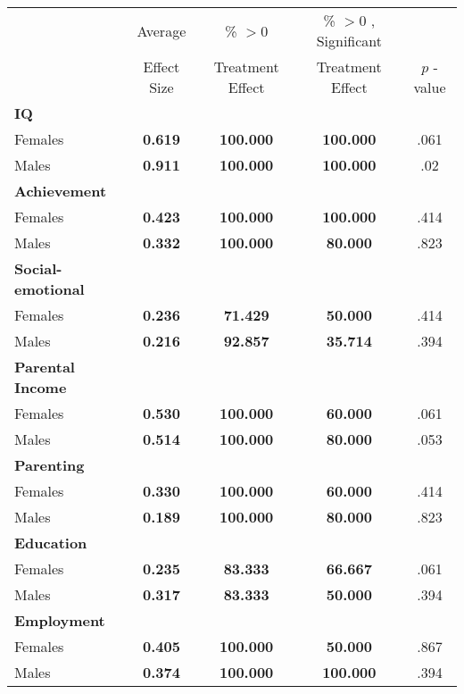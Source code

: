 \begin{tabular}{l c c c c}
\toprule
 & Average & \% $ >0 $ & \% $ >0 $ , Significant & \citet{Rosenbaum_2005_Distribution_JRSS} \\
 & Effect Size & Treatment Effect & Treatment Effect & $ p $ -value \\
\midrule
\textbf{IQ} & & & & \\
\quad Females &  \textbf{    0.619} & \textbf{  100.000} & \textbf{  100.000} & .061 \\
\quad Males &  \textbf{    0.911} & \textbf{  100.000} & \textbf{  100.000} & .02 \\
\midrule
\textbf{Achievement} & & & & \\
\quad Females &  \textbf{    0.423} & \textbf{  100.000} & \textbf{  100.000} & .414 \\
\quad Males &  \textbf{    0.332} & \textbf{  100.000} & \textbf{   80.000} & .823 \\
\midrule
\textbf{Social-emotional} & & & & \\
\quad Females &  \textbf{    0.236} & \textbf{   71.429} & \textbf{   50.000} & .414 \\
\quad Males &  \textbf{    0.216} & \textbf{   92.857} & \textbf{   35.714} & .394 \\
\midrule
\textbf{Parental Income} & & & & \\
\quad Females &  \textbf{    0.530} & \textbf{  100.000} & \textbf{   60.000} & .061 \\
\quad Males &  \textbf{    0.514} & \textbf{  100.000} & \textbf{   80.000} & .053 \\
\midrule
\textbf{Parenting} & & & & \\
\quad Females &  \textbf{    0.330} & \textbf{  100.000} & \textbf{   60.000} & .414 \\
\quad Males &  \textbf{    0.189} & \textbf{  100.000} & \textbf{   80.000} & .823 \\
\midrule
\textbf{Education} & & & & \\
\quad Females &  \textbf{    0.235} & \textbf{   83.333} & \textbf{   66.667} & .061 \\
\quad Males &  \textbf{    0.317} & \textbf{   83.333} & \textbf{   50.000} & .394 \\
\midrule
\textbf{Employment} & & & & \\
\quad Females &  \textbf{    0.405} & \textbf{  100.000} & \textbf{   50.000} & .867 \\
\quad Males &  \textbf{    0.374} & \textbf{  100.000} & \textbf{  100.000} & .394 \\

\end{tabular}
